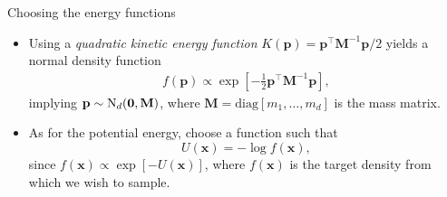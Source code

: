 \documentclass{beamer}\usepackage[]{graphicx}\usepackage[]{color}
\newcommand{\N}{\text{\normalfont N}}
\begin{document}
\begin{frame}{Choosing the energy functions}
	\begin{itemize}
		\item Using a \textit{quadratic kinetic energy function} $K(\mathbf p) = \mathbf p^\top \mathbf M^{-1} \mathbf p / 2$ yields a normal density function
		\begin{align*}
			f(\mathbf p) \propto \exp \left[ -\frac{1}{2} \mathbf p^\top \mathbf M^{-1} \mathbf p \right],
		\end{align*}
		implying $\mathbf p \sim \N_d(\mathbf 0, \mathbf M)$, where $\mathbf M = \text{diag}[m_1, \dots, m_d]$ is the mass matrix.

		\pause
		\item As for the potential energy, choose a function such that
		\[
			 U(\mathbf x) = -\log f(\mathbf x),
		\]
		since $f(\mathbf x) \propto \exp [ - U( \mathbf x)]$, where $f(\mathbf x)$ is the target density from which we wish to sample.

	\end{itemize}
\end{frame}
\end{document}
